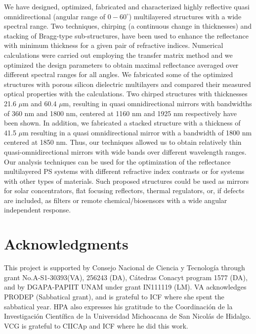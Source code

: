 \documentclass[a4paper,fleqn]{cas-sc}
\begin{document}
	We have designed, optimized, fabricated and characterized highly reflective quasi
	omnidirectional (angular range of $0-60^\circ$) multilayered structures with a wide
	spectral range. Two techniques, chirping (a continuous change in thicknesses) and
	stacking of Bragg-type sub-structures, have been used to enhance the reflectance with minimum thickness for a given pair of refractive indices. Numerical calculations were
	carried out employing the transfer matrix method and we optimized the
	design parameters to obtain maximal reflectance averaged over different spectral ranges for
	all angles. We fabricated some of the optimized structures with
	porous silicon
	dielectric multilayers and compared their measured  optical properties
	with the calculations. Two chirped structures 
	with thicknesses 21.6 $\mu$m and 60.4 $\mu$m,
	resulting in quasi omnidirectional mirrors with bandwidths of 360 nm and 1800 nm, centered
	at 1160 nm and 1925 nm respectively have been shown. In addition, we fabricated a
	stacked structure  with a thickness of 41.5 $\mu$m resulting in a quasi omnidirectional mirror
	with a bandwidth of 1800 nm centered at 1850 nm.
	Thus, our techniques allowed us to obtain relatively thin quasi-omnidirectional mirrors with wide bands
	over different wavelength ranges. 
	Our analysis techniques can
	be used for the optimization of the reflectance multilayered PS systems with
	different refractive index contrasts or for systems with other types of
	materials. Such proposed structures could be used as mirrors for solar
	concentrators, flat focusing reflectors, thermal regulators, or, if
	defects are included, as filters or remote chemical/biosensors with a
	wide angular independent response.
	
	
	\section*{Acknowledgments}
	
	This project is supported by Consejo Nacional de Ciencia y
	Tecnolog\'{i}a through grant No.A-S1-30393(VA), 256243 (DA), C\'{a}tedras
	Conacyt program 1577 (DA), and by DGAPA-PAPIIT UNAM under grant IN111119 (LM).
	VA acknowledges PRODEP (Sabbatical grant), and
	is grateful to ICF where she spent the sabbatical year.
	HPA also expresses his gratitude to the Coordinaci\'{o}n
	de la Investigaci\'{o}n Cient\'{i}fica de la Universidad
	Michoacana de San Nicol\'{a}s de Hidalgo. VCG is grateful to CIICAp 
	and ICF where he did this work.
	
	\printcredits
	
	
	
		
\end{document}
